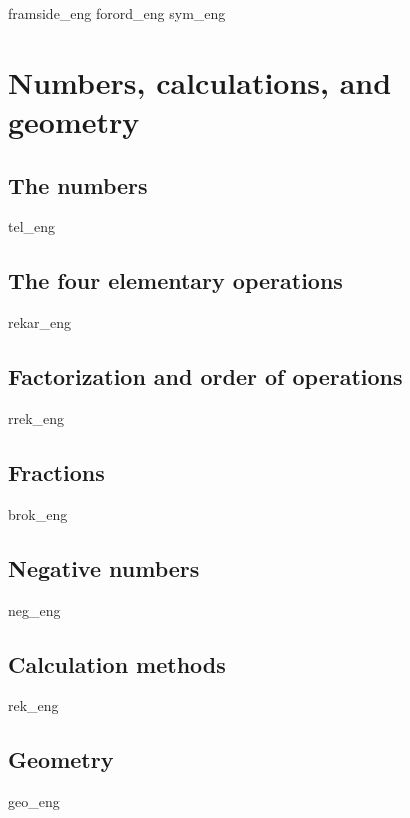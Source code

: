 





{framside_eng}
{forord_eng}
{sym_eng}
\newpage

{\footnotesize \tableofcontents}
\newpage
\part{Numbers, calculations, and geometry \label{Del1}}

\chapter{The numbers \label{Talavare}}
\newpage
{tel_eng}

\chapter{The four elementary operations \label{Rekneartane}}
\newpage
{rekar_eng}

\chapter{Factorization and order of operations}
\newpage
{rrek_eng}


\chapter{Fractions}
\newpage
{brok_eng}

\chapter{Negative numbers \label{Negtal}}
\newpage
{neg_eng}

\chapter{Calculation methods}
\newpage
{rek_eng}

\chapter{Geometry}
\newpage
{geo_eng}


